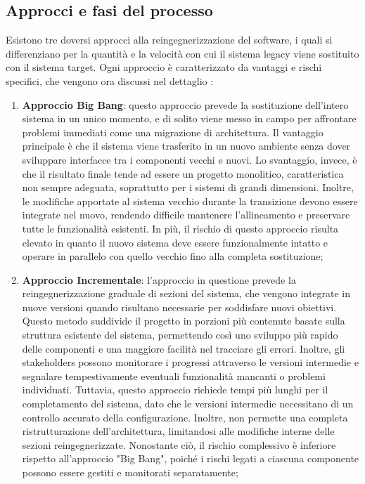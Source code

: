 \subsection{Approcci e fasi del processo}
Esistono tre doversi approcci alla reingegnerizzazione del software, i quali si differenziano per la quantità e la velocità con cui il sistema legacy viene sostituito con il sistema target. Ogni approccio è caratterizzato da vantaggi e rischi specifici, che vengono ora discussi nel dettaglio \cite{Majthoub2018,rosenberg1996software}:
\begin{enumerate}
  \item \textbf{Approccio Big Bang}: questo approccio prevede la sostituzione dell'intero sistema in un unico momento, e di solito viene messo in campo per affrontare problemi immediati come una migrazione di architettura. Il vantaggio principale è che il sistema viene trasferito in un nuovo ambiente senza dover sviluppare interfacce tra i componenti vecchi e nuovi. Lo svantaggio, invece, è che il risultato finale tende ad essere un progetto monolitico, caratteristica non sempre adeguata, soprattutto per i sistemi di grandi dimensioni. Inoltre, le modifiche apportate al sistema vecchio durante la transizione devono essere integrate nel nuovo, rendendo difficile mantenere l'allineamento e preservare tutte le funzionalità esistenti. In più, il rischio di questo approccio risulta elevato in quanto il nuovo sistema deve essere funzionalmente intatto e operare in parallelo con quello vecchio fino alla completa sostituzione;

  \item \textbf{Approccio Incrementale}: l'approccio in questione prevede la reingegnerizzazione graduale di sezioni del sistema, che vengono integrate in nuove versioni quando risultano necessarie per soddisfare nuovi obiettivi. Questo metodo suddivide il progetto in porzioni più contenute basate sulla struttura esistente del sistema, permettendo così uno sviluppo più rapido delle componenti e una maggiore facilità nel tracciare gli errori. Inoltre, gli stakeholders possono monitorare i progressi attraverso le versioni intermedie e segnalare tempestivamente eventuali funzionalità mancanti o problemi individuati. Tuttavia, questo approccio richiede tempi più lunghi per il completamento del sistema, dato che le versioni intermedie necessitano di un controllo accurato della configurazione. Inoltre, non permette una completa ristrutturazione dell'architettura, limitandosi alle modifiche interne delle sezioni reingegnerizzate. Nonostante ciò, il rischio complessivo è inferiore rispetto all'approccio "Big Bang", poiché i rischi legati a ciascuna componente possono essere gestiti e monitorati separatamente;


\end{enumerate}
